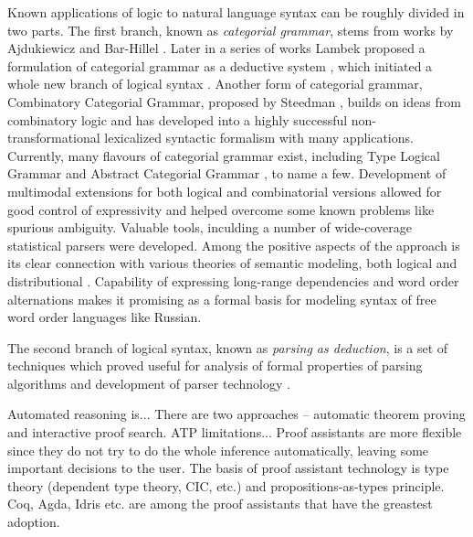 \documentclass[a4paper]{article}
\theoremstyle{example-style}
\begin{document}
Known applications of logic to natural language syntax can be roughly divided in two parts. The first branch, known as \textit{categorial grammar}, stems from works by Ajdukiewicz and Bar-Hillel \parencite{ajdukiewicz1935,bar1953quasi}. Later in a series of works Lambek proposed a formulation of categorial grammar as a deductive system \parencite{lambek1958mathematics,lambek1961calculus}, which initiated a whole new branch of logical syntax \parencite{moot2012logic}. Another form of categorial grammar, Combinatory Categorial Grammar, proposed by Steedman \parencite{steedman2000syntactic}, builds on ideas from combinatory logic and has developed into a highly successful non-transformational lexicalized syntactic formalism with many applications. Currently, many flavours of categorial grammar exist, including Type Logical Grammar \parencite{morrill1994type} and Abstract Categorial Grammar \parencite{degroot2001towards}, to name a few. Development of multimodal extensions for both logical and combinatorial versions allowed for good control of expressivity and helped overcome some known problems like spurious ambiguity. Valuable tools, inculding a number of wide-coverage statistical parsers \parencite{curran2007linguistically,white2008open} were developed. Among the positive aspects of the approach is its clear connection with various theories of semantic modeling, both logical \parencite{steedman2000syntactic,bos2008wide,baldridge2002coupling} and distributional \parencite{maillard2014type}. Capability of expressing long-range dependencies and word order alternations makes it promising as a formal basis for modeling syntax of free word order languages like Russian.

The second branch of logical syntax, known as \textit{parsing as deduction}, is a set of techniques which proved useful for analysis of formal properties of parsing algorithms and development of parser technology \parencite{pereira1983parsing,kallmeyer2010parsing}.

Automated reasoning is... There are two approaches -- automatic theorem proving and interactive proof search. ATP limitations... Proof assistants are more flexible since they do not try to do the whole inference automatically, leaving some important decisions to the user. The basis of proof assistant technology is type theory (dependent type theory, CIC, etc.) and propositions-as-types principle. Coq, Agda, Idris etc. are among the proof assistants that have the greastest adoption. 
\end{document}
